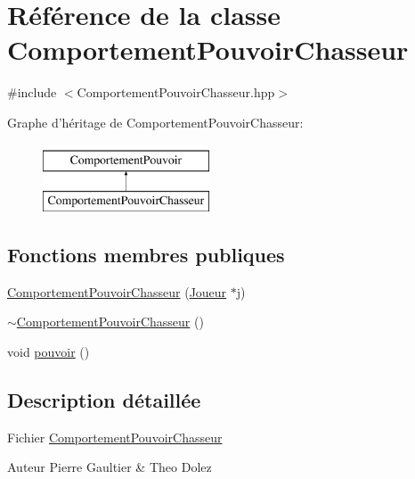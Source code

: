 \hypertarget{class_comportement_pouvoir_chasseur}{\section{Référence de la classe Comportement\-Pouvoir\-Chasseur}
\label{class_comportement_pouvoir_chasseur}
}


{\ttfamily \#include $<$Comportement\-Pouvoir\-Chasseur.\-hpp$>$}

Graphe d'héritage de Comportement\-Pouvoir\-Chasseur\-:\begin{figure}[H]
\begin{center}
\leavevmode
\includegraphics[height=2.000000cm]{class_comportement_pouvoir_chasseur}
\end{center}
\end{figure}
\subsection*{Fonctions membres publiques}
\begin{DoxyCompactItemize}
\item 
\hyperlink{class_comportement_pouvoir_chasseur_a051c87d077549a7edb5eb1e8c9944aff}{Comportement\-Pouvoir\-Chasseur} (\hyperlink{class_joueur}{Joueur} $\ast$j)
\item 
\hyperlink{class_comportement_pouvoir_chasseur_aaad834dea06fd69007e220d611927091}{$\sim$\-Comportement\-Pouvoir\-Chasseur} ()
\item 
void \hyperlink{class_comportement_pouvoir_chasseur_a334058c088f33d706f636cadd97150da}{pouvoir} ()
\end{DoxyCompactItemize}


\subsection{Description détaillée}
Fichier \hyperlink{class_comportement_pouvoir_chasseur}{Comportement\-Pouvoir\-Chasseur} \begin{DoxyAuthor}{Auteur}
Pierre Gaultier \& Theo Dolez 
\end{DoxyAuthor}


